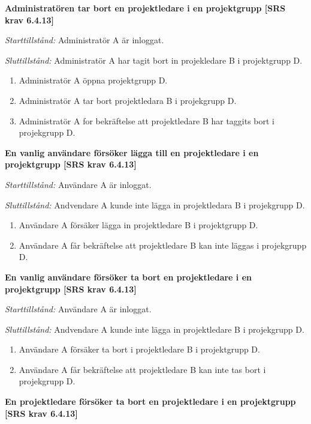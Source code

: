 \documentclass[a4paper]{article}
\begin{document}
\begin{FT}
\item %
\textbf{Administratören tar bort en projektledare i en projektgrupp [SRS krav 6.4.13]}

\emph{Starttillstånd:} Administratör A är inloggat.

\emph{Sluttillstånd:} Administratör A har tagit bort  in projekledare B i projektgrupp D.

\begin{enumerate}
\item Administratör A öppna projektgrupp D.
\item Administratör A tar bort  projektledara B i projekgrupp D.
\item Administratör A for bekräftelse att projektledare B har taggits  bort i projekgrupp D.
\end{enumerate}

\item %
\textbf{En vanlig användare försöker lägga till en projektledare i en projektgrupp [SRS krav 6.4.13]} 

\emph{Starttillstånd:}  Användare A är inloggat.

\emph{Sluttillstånd:} Andvendare A kunde inte lägga in projektledara B i projekgrupp D.

\begin{enumerate}
\item Användare  A
försäker lägga in projektledare B i  projektgrupp D.
\item Användare A får bekräftelse att projektledare B kan inte läggas i   projekgrupp D.
\end{enumerate}

\item %
\textbf{En vanlig användare försöker ta bort en projektledare i en projektgrupp [SRS krav 6.4.13]}

\emph{Starttillstånd:} Användare A är inloggat.

\emph{Sluttillstånd:} Andvendare A kunde inte lägga in projektledare B i projekgrupp D.

\begin{enumerate}
\item Användare A försäker ta bort  i projektledare B  i  projektgrupp D.
\item Användare A får bekräftelse att projektledare B kan inte tas bort  i   projekgrupp D.
\end{enumerate}

\item %
\textbf{En projektledare försöker ta bort en projektledare i en projektgrupp [SRS krav 6.4.13]}


\end{FT}
\end{document}
